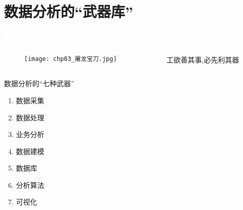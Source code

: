 
\section{数据分析的``武器库''}

\begin{frame}{\textcolor{white}{空白}}

  \begin{columns}
    \begin{column}{.5\textwidth}
      \begin{figure}
        \centering \texttt{[image: chp03\_屠龙宝刀.jpg]}
      \end{figure}
    \end{column}

    \begin{column}{.5\textwidth}
      \begin{ornamentblock}
        \centering
        {工欲善其事,必先利其器
          }
      \end{ornamentblock}
    \end{column}
  \end{columns}

\end{frame}

\begin{frame}{数据分析的``七种武器''}
\begin{enumerate}\large
\item 数据采集
\item 数据处理
\item 业务分析
\item 数据建模
\item 数据库
\item 分析算法
\item 可视化
\end{enumerate}
\end{frame}

